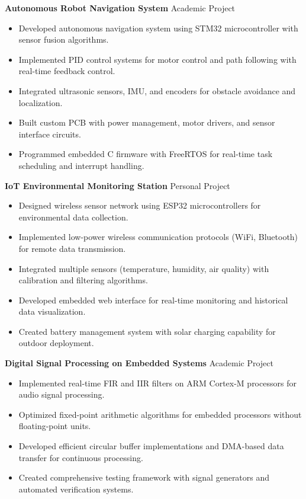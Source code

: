 \documentclass[letterpaper,10pt]{article}
\begin{document}
\vspace{0.2cm}
\noindent\textbf{Autonomous Robot Navigation System} \hfill Academic Project
\begin{itemize}[leftmargin=0.2in]
    \item Developed autonomous navigation system using STM32 microcontroller with sensor fusion algorithms.
    \item Implemented PID control systems for motor control and path following with real-time feedback control.
    \item Integrated ultrasonic sensors, IMU, and encoders for obstacle avoidance and localization.
    \item Built custom PCB with power management, motor drivers, and sensor interface circuits.
    \item Programmed embedded C firmware with FreeRTOS for real-time task scheduling and interrupt handling.
\end{itemize}

\vspace{0.2cm}
\noindent\textbf{IoT Environmental Monitoring Station} \hfill Personal Project
\begin{itemize}[leftmargin=0.2in]
    \item Designed wireless sensor network using ESP32 microcontrollers for environmental data collection.
    \item Implemented low-power wireless communication protocols (WiFi, Bluetooth) for remote data transmission.
    \item Integrated multiple sensors (temperature, humidity, air quality) with calibration and filtering algorithms.
    \item Developed embedded web interface for real-time monitoring and historical data visualization.
    \item Created battery management system with solar charging capability for outdoor deployment.
\end{itemize}

\vspace{0.2cm}
\noindent\textbf{Digital Signal Processing on Embedded Systems} \hfill Academic Project
\begin{itemize}[leftmargin=0.2in]
    \item Implemented real-time FIR and IIR filters on ARM Cortex-M processors for audio signal processing.
    \item Optimized fixed-point arithmetic algorithms for embedded processors without floating-point units.
    \item Developed efficient circular buffer implementations and DMA-based data transfer for continuous processing.
    \item Created comprehensive testing framework with signal generators and automated verification systems.
\end{itemize}
\end{document}
